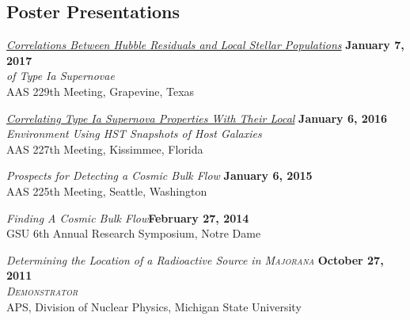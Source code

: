 \documentclass[margin]{res}
\begin{document}
\begin{resume}



\section{Poster Presentations}


\href{https://ui.adsabs.harvard.edu/#abs/2017AAS...22943402R/abstract}{{\sl Correlations Between Hubble Residuals and Local Stellar Populations}} \hfill {\bf January 7, 2017} \\
\textit{of Type Ia Supernovae}\\
AAS 229th Meeting, Grapevine, Texas

\href{https://ui.adsabs.harvard.edu/#abs/2016AAS...22723711R/abstract}{{\sl Correlating Type Ia Supernova Properties With Their Local}} \hfill {\bf January 6, 2016} \\
\textit{Environment Using HST Snapshots of Host Galaxies} \\
AAS 227th Meeting, Kissimmee, Florida

{\sl Prospects for Detecting a Cosmic Bulk Flow} \hfill {\bf January 6, 2015}\\
AAS 225th Meeting, Seattle, Washington  

{\sl Finding A Cosmic Bulk Flow}\hfill {\bf February 27, 2014}\\
GSU 6th Annual Research Symposium, Notre Dame 

{\sl Determining the Location of a Radioactive Source in \textsc{Majorana}} \hfill {\bf October 27, 2011}\\
\textit{\textsc{Demonstrator}} \\
APS, Division of Nuclear Physics, Michigan State University 


\end{resume}
\end{document}
